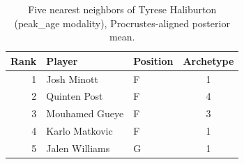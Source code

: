 \begin{table}[htbp]
  \centering\small
  \begin{tabular}{rllc}
    \toprule
    Rank & Player & Position & Archetype \\
    \midrule
    1 & Josh Minott & F & 1 \\
    2 & Quinten Post & F & 4 \\
    3 & Mouhamed Gueye & F & 3 \\
    4 & Karlo Matkovic & F & 1 \\
    5 & Jalen Williams & G & 1 \\
    \bottomrule
  \end{tabular}
  \caption{Five nearest neighbors of Tyrese Haliburton (peak_age modality), Procrustes-aligned posterior mean.}
  \label{tab:Tyrese_Haliburton_neighbors_peak_age}
\end{table}

